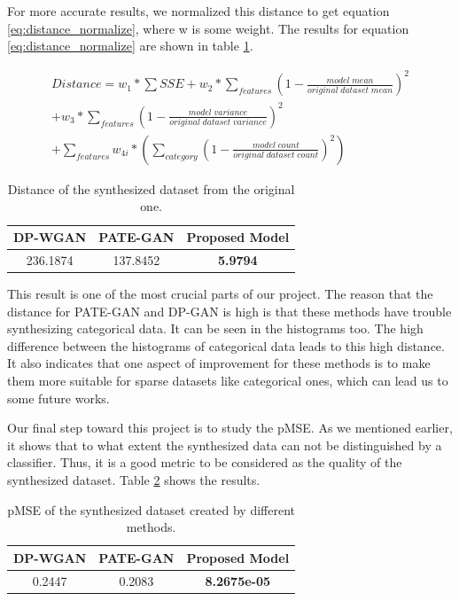\documentclass{article}
\begin{document}
For more accurate results, we normalized this distance to get equation \ref{eq:distance_normalize}, where w is some weight. The results for equation \ref{eq:distance_normalize} are shown in table \ref{table:distance}.

\begin{multline}
Distance = w_1 * \sum SSE + w_2 * \sum_{features}(1 - \frac{model\;mean}{original\;dataset\;mean})^2 \\
+ w_3 * \sum_{features}(1 - \frac{model\;variance}{original\;dataset\;variance})^2 \\
+ \sum_{features}w_{4i} * (\sum_{category}(1 - \frac{model\;count}{original\;dataset\;count})^2)
\label{eq:distance_normalize}
\end{multline}

\begin{table}[ht]
    \centering
    \begin{tabular}{||c c c||}
        \hline
        DP-WGAN & PATE-GAN & Proposed Model \\ [0.5ex] 
        \hline\hline
        236.1874 & 137.8452 & \textbf{5.9794} \\ [1ex] 
        \hline
    \end{tabular}
    \caption{Distance of the synthesized dataset from the original one.}
    \label{table:distance}
\end{table}

This result is one of the most crucial parts of our project. The reason that the distance for PATE-GAN and DP-GAN is high is that these methods have trouble synthesizing categorical data. It can be seen in the histograms too. The high difference between the histograms of categorical data leads to this high distance. It also indicates that one aspect of improvement for these methods is to make them more suitable for sparse datasets like categorical ones, which can lead us to some future works.

Our final step toward this project is to study the pMSE. As we mentioned earlier, it shows that to what extent the synthesized data can not be distinguished by a classifier. Thus, it is a good metric to be considered as the quality of the synthesized dataset. Table \ref{table:pmse} shows the results.

\begin{table}[ht]
    \centering
    \begin{tabular}{||c c c||}
        \hline
        DP-WGAN & PATE-GAN & Proposed Model \\ [0.5ex] 
        \hline\hline
        0.2447 & 0.2083 & \textbf{8.2675e-05} \\ [1ex] 
        \hline
    \end{tabular}
    \caption{pMSE of the synthesized dataset created by different methods.}
    \label{table:pmse}
\end{table}
\end{document}
